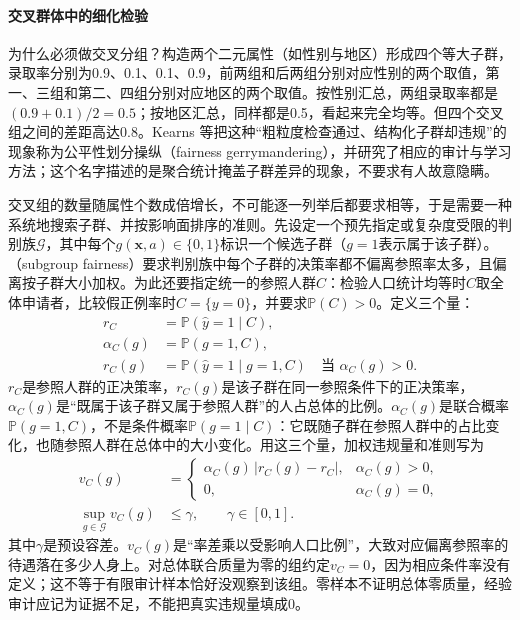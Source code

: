 \paragraph{交叉群体中的细化检验}

为什么必须做交叉分组？构造两个二元属性（如性别与地区）形成四个等大子群，录取率分别为0.9、0.1、0.1、0.9，前两组和后两组分别对应性别的两个取值，第一、三组和第二、四组分别对应地区的两个取值。按性别汇总，两组录取率都是$(0.9+0.1)/2=0.5$；按地区汇总，同样都是0.5，看起来完全均等。但四个交叉组之间的差距高达0.8。Kearns 等把这种“粗粒度检查通过、结构化子群却违规”的现象称为公平性划分操纵（fairness gerrymandering），并研究了相应的审计与学习方法；这个名字描述的是聚合统计掩盖子群差异的现象，不要求有人故意隐瞒。

交叉组的数量随属性个数成倍增长，不可能逐一列举后都要求相等，于是需要一种系统地搜索子群、并按影响面排序的准则。先设定一个预先指定或复杂度受限的判别族$\mathcal G$，其中每个$g(\bm{x},a)\in\{0,1\}$标识一个候选子群（$g=1$表示属于该子群）。（subgroup fairness）要求判别族中每个子群的决策率都不偏离参照率太多，且偏离按子群大小加权。为此还要指定统一的参照人群$C$：检验人口统计均等时$C$取全体申请者，比较假正例率时$C=\{y=0\}$，并要求$\mathbb P(C)>0$。定义三个量：
\begin{align*}
 r_C&=\mathbb P(\hat y=1\mid C),\\
 \alpha_C(g)&=\mathbb P(g=1,C),\\
 r_C(g)&=\mathbb P(\hat y=1\mid g=1,C)
 \quad\text{当 }\alpha_C(g)>0.
\end{align*}
$r_C$是参照人群的正决策率，$r_C(g)$是该子群在同一参照条件下的正决策率，$\alpha_C(g)$是“既属于该子群又属于参照人群”的人占总体的比例。$\alpha_C(g)$是联合概率$\mathbb P(g=1,C)$，不是条件概率$\mathbb P(g=1\mid C)$：它既随子群在参照人群中的占比变化，也随参照人群在总体中的大小变化。用这三个量，加权违规量和准则写为
\begin{equation}
 \begin{aligned}
 v_C(g)&=
 \begin{cases}
  \alpha_C(g)\,|r_C(g)-r_C|,&\alpha_C(g)>0,\\
  0,&\alpha_C(g)=0,
 \end{cases}\\
 \sup_{g\in\mathcal G}v_C(g)&\leq\gamma,\qquad \gamma\in[0,1].
 \end{aligned}
 \label{eq:fairness-subgroup-violation}
\end{equation}
其中$\gamma$是预设容差。$v_C(g)$是“率差乘以受影响人口比例”，大致对应偏离参照率的待遇落在多少人身上。对总体联合质量为零的组约定$v_C=0$，因为相应条件率没有定义；这不等于有限审计样本恰好没观察到该组。零样本不证明总体零质量，经验审计应记为证据不足，不能把真实违规量填成0。

